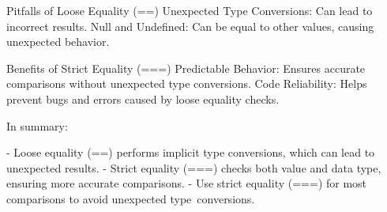 Pitfalls of Loose Equality (==)
  Unexpected Type Conversions: Can lead to incorrect results.
  Null and Undefined: Can be equal to other values, causing unexpected behavior.

Benefits of Strict Equality (===)
  Predictable Behavior: Ensures accurate comparisons without unexpected type conversions.
  Code Reliability: Helps prevent bugs and errors caused by loose equality checks.

In summary:

- Loose equality (==) performs implicit type conversions, which can lead to unexpected results.
- Strict equality (===) checks both value and data type, ensuring more accurate comparisons.
- Use strict equality (===) for most comparisons to avoid unexpected type conversions.








    

     


          